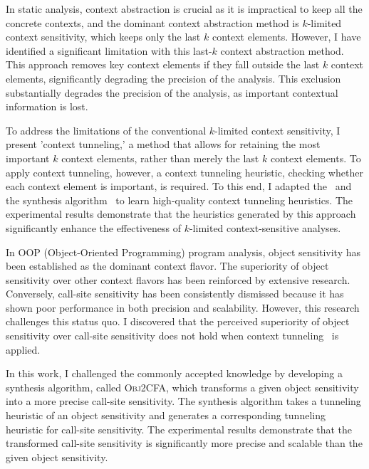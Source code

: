 \documentclass[11pt]{article}
\newcommand{\myparagraph}[1]{\medskip\noindent{\it \textbf{#1.}}}
\begin{document}
\myparagraph{Context Tunneling~\cite{JeJeOh18}}
%
In static analysis, context abstraction is crucial as it is impractical to keep all the concrete contexts, and the dominant context abstraction method is $k$-limited context sensitivity, which keeps only the last $k$ context elements.
%
However, I have identified a significant limitation with this last-$k$ context abstraction method.
%
This approach removes key context elements if they fall outside the last $k$ context elements, significantly degrading the precision of the analysis.
%
This exclusion substantially degrades the precision of the analysis, as important contextual information is lost.





To address the limitations of the conventional $k$-limited context sensitivity, I present 'context tunneling,' a method that allows for retaining the most important $k$ context elements, rather than merely the last $k$ context elements.
%
To apply context tunneling, however, a context tunneling heuristic, checking whether each context element is important, is required.
%
To this end, I adapted the \DisjunctiveModel~and the synthesis algorithm~\cite{JeJeChOh17} to learn high-quality context tunneling heuristics.
%
The experimental results demonstrate that the heuristics generated by this approach significantly enhance the effectiveness of $k$-limited context-sensitive analyses.



\myparagraph{Obj2CFA~\cite{JeOh22}}
%
In OOP (Object-Oriented Programming) program analysis, object sensitivity has been established as the dominant context flavor.
%
The superiority of object sensitivity over other context flavors has been reinforced by extensive research.
%
Conversely, call-site sensitivity has been consistently dismissed because it has shown poor performance in both precision and scalability.
%
However, this research challenges this status quo. 
I discovered that the perceived superiority of object sensitivity over call-site sensitivity does not hold when context tunneling~\cite{JeJeOh18} is applied.


In this work, I challenged the commonly accepted knowledge by developing a synthesis algorithm, called \textsc{Obj2CFA}, which transforms a given object sensitivity into a more precise call-site sensitivity.
%
The synthesis algorithm takes a tunneling heuristic of an object sensitivity and generates a corresponding tunneling heuristic for call-site sensitivity.
%
The experimental results demonstrate that the transformed call-site sensitivity is significantly more precise and scalable than the given object sensitivity.
\end{document}
